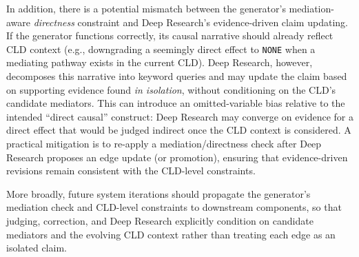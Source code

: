 In addition, there is a potential mismatch between the generator's mediation-aware \emph{directness} constraint and Deep Research's evidence-driven claim updating. If the generator functions correctly, its causal narrative should already reflect CLD context (e.g., downgrading a seemingly direct effect to \texttt{NONE} when a mediating pathway exists in the current CLD). Deep Research, however, decomposes this narrative into keyword queries and may update the claim based on supporting evidence found \emph{in isolation}, without conditioning on the CLD's candidate mediators. This can introduce an omitted-variable bias relative to the intended ``direct causal'' construct: Deep Research may converge on evidence for a direct effect that would be judged indirect once the CLD context is considered. A practical mitigation is to re-apply a mediation/directness check after Deep Research proposes an edge update (or promotion), ensuring that evidence-driven revisions remain consistent with the CLD-level constraints.

More broadly, future system iterations should propagate the generator's mediation check and CLD-level constraints to downstream components, so that judging, correction, and Deep Research explicitly condition on candidate mediators and the evolving CLD context rather than treating each edge as an isolated claim.